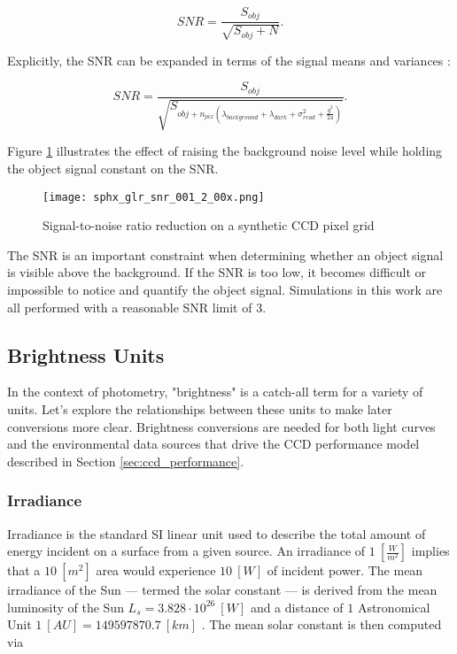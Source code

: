 \begin{equation} \label{eq:ccd_snr}
  SNR = \frac{S_{obj}}{\sqrt{S_{obj}+N}}.
\end{equation}

Explicitly, the SNR can be expanded in terms of the signal means and variances \cite{frueh2019notes}:

\begin{equation} \label{eq:ccd_snr_expanded}
  SNR = \frac{S_{obj}}{\sqrt{S_{obj + n_{pix} \left( \lambda_{background} + \lambda_{dark} + \sigma^2_{read} + \frac{g^2}{24} \right)}}}.
\end{equation}

Figure \ref{fig:snr_grid} illustrates the effect of raising the background noise level while holding the object signal constant on the SNR.

\begin{figure}[ht]
  \centering
  \texttt{[image: sphx\_glr\_snr\_001\_2\_00x.png]}
  \caption{Signal-to-noise ratio reduction on a synthetic CCD pixel grid}
  \label{fig:snr_grid}
\end{figure}

The SNR is an important constraint when determining whether an object signal is visible above the background. If the SNR is too low, it becomes difficult or impossible to notice and quantify the object signal. Simulations in this work are all performed with a reasonable SNR limit of $3$.

\subsection{Brightness Units}

In the context of photometry, "brightness" is a catch-all term for a variety of units. Let's explore the relationships between these units to make later conversions more clear. Brightness conversions are needed for both light curves and the environmental data sources that drive the CCD performance model described in Section \ref{sec:ccd_performance}.

\subsubsection{Irradiance}

Irradiance is the standard SI linear unit used to describe the total amount of energy incident on a
surface from a given source. An irradiance of $1 \: \left[ \frac{W}{m^2} \right]$ implies that a $10
\: [m^2]$ area would experience $10 \: [W]$ of incident power. The mean irradiance of the Sun --- termed the solar constant --- is derived from the mean luminosity of the Sun $L_s = 3.828\cdot10^{26} \: [W]$ and a distance of $1$ Astronomical Unit $1 \: [AU] = 149597870.7 \: [km]$ \cite{frueh2019notes}. The mean solar constant is then computed via


